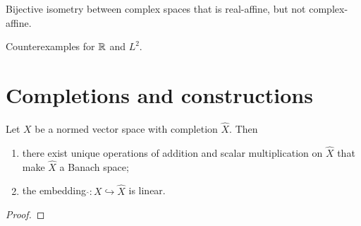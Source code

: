 \begin{example}
Bijective isometry between complex spaces that is real-affine, but not complex-affine.
\end{example}

\begin{theorem}

\end{theorem}

\begin{example}
Counterexamples for $\mathbb{R}$ and $L^2$.
\end{example}

\section{Completions and constructions}

\begin{lemma} \label{embeddingInCompletionLinear}
Let $X$ be a normed vector space with completion $\hat{X}$. Then
\begin{enumerate}
\item there exist unique operations of addition and scalar multiplication on $\hat{X}$ that make $\hat{X}$ a Banach space;
\item the embedding $\hat{}: X \hookrightarrow \hat{X}$ is linear.
\end{enumerate}
\end{lemma}
\begin{proof}

\end{proof}


